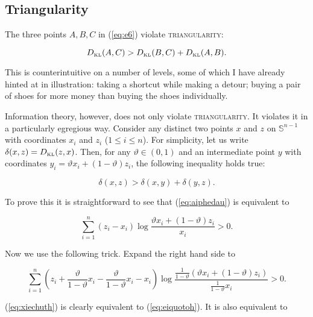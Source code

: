 \documentclass[11pt]{article}
\begin{document}
\subsection{Triangularity}
\label{subsec:triangularity}

The three points $A,B,C$ in (\ref{eq:e6}) violate
\textsc{triangularity}:

\begin{equation}
  \label{eq:yohliimo}
  D_{\mbox{\tiny KL}}(A,C)>D_{\mbox{\tiny KL}}(B,C)+D_{\mbox{\tiny KL}}(A,B).
\end{equation}

This is counterintuitive on a number of levels, some of which I have
already hinted at in illustration: taking a shortcut while making a
detour; buying a pair of shoes for more money than buying the shoes
individually.

Information theory, however, does not only violate
\textsc{triangularity}. It violates it in a particularly egregious
way. Consider any distinct two points $x$ and $z$ on
$\mathbb{S}^{n-1}$ with coordinates $x_{i}$ and $z_{i}$
($1\leq{}i\leq{}n$). For simplicity, let us write
$\delta(x,z)=D_{\mbox{\tiny KL}}(z,x)$. Then, for any
$\vartheta\in{}(0,1)$ and an intermediate point $y$ with coordinates
$y_{i}=\vartheta{}x_{i}+(1-\vartheta)z_{i}$, the following inequality
holds true:

\begin{equation}
  \label{eq:aiphedau}
  \delta(x,z)>\delta\left(x,y\right)+\delta\left(y,z\right).
\end{equation}

To prove this it is straightforward to see that (\ref{eq:aiphedau}) is
equivalent to

\begin{equation}
  \label{eq:eiquotoh}
  \sum_{i=1}^{n}(z_{i}-x_{i})\log\frac{\vartheta{}x_{i}+(1-\vartheta)z_{i}}{x_{i}}>0.
\end{equation}

Now we use the following trick. Expand the right hand side to

\begin{equation}
  \label{eq:xiechuth}
  \sum_{i=1}^{n}\left(z_{i}+\frac{\vartheta}{1-\vartheta}x_{i}-\frac{\vartheta}{1-\vartheta}x_{i}-x_{i}\right)\log\frac{\frac{1}{1-\vartheta}\left(\vartheta{}x_{i}+(1-\vartheta)z_{i}\right)}{\frac{1}{1-\vartheta}x_{i}}>0.
\end{equation}

(\ref{eq:xiechuth}) is clearly equivalent to (\ref{eq:eiquotoh}). It
is also equivalent to
\end{document}
